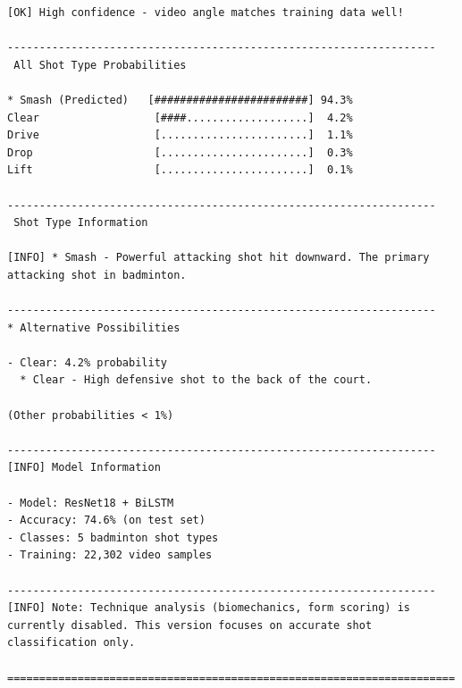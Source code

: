 \documentclass[11pt,a4paper]{article}
\begin{document}
\begin{verbatim}
[OK] High confidence - video angle matches training data well!

-------------------------------------------------------------------
 All Shot Type Probabilities

* Smash (Predicted)   [########################] 94.3%
Clear                  [####...................]  4.2%
Drive                  [.......................]  1.1%
Drop                   [.......................]  0.3%
Lift                   [.......................]  0.1%

-------------------------------------------------------------------
 Shot Type Information

[INFO] * Smash - Powerful attacking shot hit downward. The primary
attacking shot in badminton.

-------------------------------------------------------------------
* Alternative Possibilities

- Clear: 4.2% probability
  * Clear - High defensive shot to the back of the court.

(Other probabilities < 1%)

-------------------------------------------------------------------
[INFO] Model Information

- Model: ResNet18 + BiLSTM
- Accuracy: 74.6% (on test set)
- Classes: 5 badminton shot types
- Training: 22,302 video samples

-------------------------------------------------------------------
[INFO] Note: Technique analysis (biomechanics, form scoring) is
currently disabled. This version focuses on accurate shot
classification only.

======================================================================
\end{verbatim}
\end{document}
